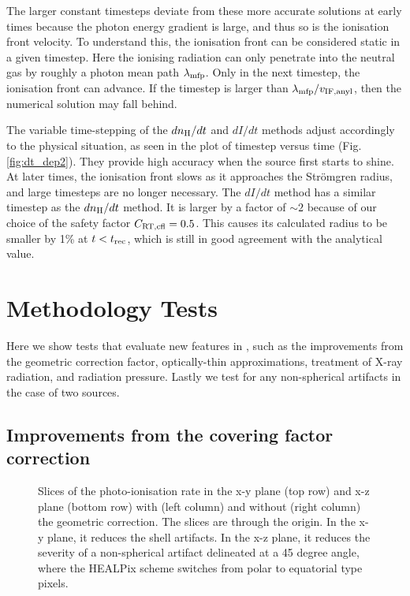 \documentclass[useAMS,usenatbib]{mn2e}
\begin{document}
The larger constant timesteps deviate from these more accurate
solutions at early times because the photon energy gradient is large,
and thus so is the ionisation front velocity.  To understand this, the
ionisation front can be considered static in a given timestep.  Here
the ionising radiation can only penetrate into the neutral gas by
roughly a photon mean path $\lambda_{\rm mfp}$.  Only in the next
timestep, the ionisation front can advance.  If the timestep is larger
than $\lambda_{\rm mfp} / v_{\rm IF, anyl}$, then the numerical
solution may fall behind.

The variable time-stepping of the $dn_{\rm H}/dt$ and $dI/dt$ methods
adjust accordingly to the physical situation, as seen in the plot of
timestep versus time (Fig. \ref{fig:dt_dep2}).  They provide high
accuracy when the source first starts to shine.  At later times, the
ionisation front slows as it approaches the Str\"{o}mgren radius, and
large timesteps are no longer necessary.  The $dI/dt$ method has a
similar timestep as the $dn_{\rm H}/dt$ method.  It is larger by a
factor of $\sim 2$ because of our choice of the safety factor $C_{\rm
  RT, cfl} = 0.5$.  This causes its calculated radius to be smaller by
1\% at $t < t_{\rm rec}$, which is still in good agreement with the
analytical value.

\section{Methodology Tests}

Here we show tests that evaluate new features in \moray, such as the
improvements from the geometric correction factor, optically-thin
approximations, treatment of X-ray radiation, and radiation pressure.
Lastly we test for any non-spherical artifacts in the case of two
sources.

\subsection{Improvements from the covering factor correction}
\label{sec:test_fc}

\begin{figure}
  \caption{\label{fig:fc_slices} Slices of the photo-ionisation rate
    in the x-y plane (top row) and x-z plane (bottom row) with (left
    column) and without (right column) the geometric correction.  The
    slices are through the origin.  In the x-y plane, it reduces the
    shell artifacts.  In the x-z plane, it reduces the severity of a
    non-spherical artifact delineated at a 45 degree angle, where the
    HEALPix scheme switches from polar to equatorial type pixels.}
\end{figure}
\end{document}
